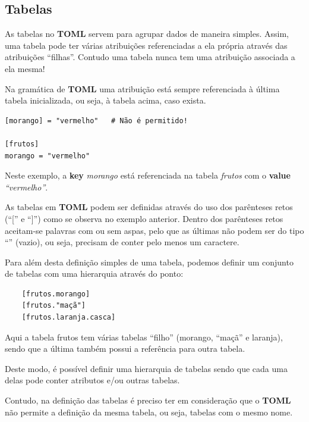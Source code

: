 \documentclass[a4paper,12pt]{report}
\begin{document}
\vspace{10cm}

\subsection{Tabelas}

\par As tabelas no \textbf{TOML} servem para agrupar dados de maneira simples. Assim, uma tabela pode ter várias atribuições referenciadas a ela própria através das atribuições ``filhas''. Contudo uma tabela nunca tem uma atribuição associada a ela mesma!
\par Na gramática de \textbf{TOML} uma atribuição está sempre referenciada à última tabela inicializada, ou seja, à tabela acima, caso exista. 

\begin{verbatim}
[morango] = "vermelho"   # Não é permitido!

[frutos]
morango = "vermelho"
\end{verbatim}

\par Neste exemplo, a \textbf{key} \textit{morango} está referenciada na tabela \textit{frutos} com o \textbf{value} \textit{``vermelho''}.

\vspace{0.3cm}

As tabelas em \textbf{TOML} podem ser definidas através do uso dos parênteses retos (``['' e ``]'') como se observa no exemplo anterior. Dentro dos parênteses retos aceitam-se palavras com ou sem aspas, pelo que as últimas não podem ser do tipo ``'' (vazio), ou seja, precisam de conter pelo menos um caractere.

Para além desta definição simples de uma tabela, podemos definir um conjunto de tabelas com uma hierarquia através do ponto:
\begin{verbatim}
    [frutos.morango]
    [frutos."maçã"]
    [frutos.laranja.casca]
\end{verbatim}

Aqui a tabela frutos tem várias tabelas ``filho'' (morango, ``maçã'' e laranja), sendo que a última também possui a referência para outra tabela.
\par Deste modo, é possível definir uma hierarquia de tabelas sendo que cada uma delas pode conter atributos e/ou outras tabelas.

\par Contudo, na definição das tabelas é preciso ter em consideração que o \textbf{TOML} não permite a definição da mesma tabela, ou seja, tabelas com o mesmo nome.
\end{document}
